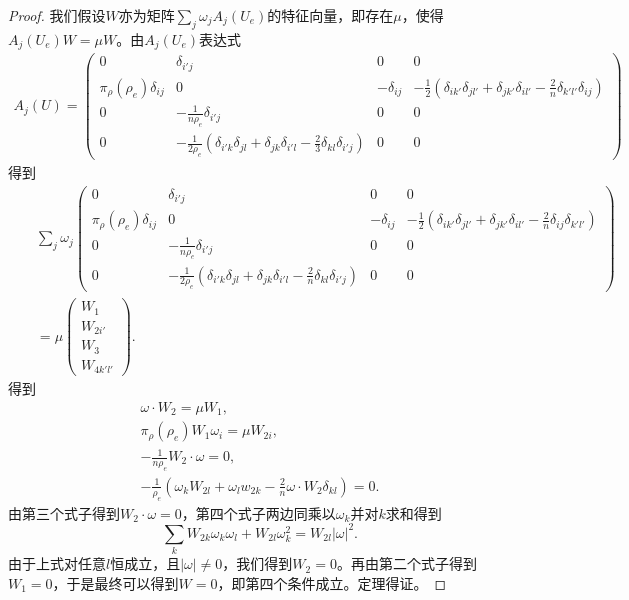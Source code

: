 \begin{proof}
	我们假设$W$亦为矩阵$\sum_j \omega_j A_j(U_e)$的特征向量，即存在$\mu$，使得$A_j(U_e) W = \mu W$。由$A_j(U_e)$表达式
	\begin{eqnarray*}
	    A_{j}(U) =
 		\left( \begin{smallmatrix} 
 		0 & \delta_{i'j} & 0 & 0  \\
 		\pi_\rho(\rho_e) \delta_{ij} & 0  &  - \delta_{ij} & -\frac{1}{2}(\delta_{ik'}\delta_{jl'} + \delta_{jk'} \delta_{il'} - \frac{2}{n} \delta_{k'l'}\delta_{ij}) \\
 		0 & - \frac{1}{n \rho_e} \delta_{i'j} & 0 & 0 \\
 		0 & -\frac{1}{2\rho_e}(\delta_{i'k}\delta_{jl} + \delta_{jk} \delta_{i'l} - \frac{2}{3} \delta_{kl} \delta_{i'j}) & 0 & 0
 		\end{smallmatrix} \right)
 	\end{eqnarray*}
	得到
	\begin{eqnarray*}
		&& \sum_j \omega_j \left( \begin{smallmatrix} 
 		0 & \delta_{i'j} & 0 & 0  \\
 		\pi_\rho(\rho_e) \delta_{ij} & 0  &  - \delta_{ij} & -\frac{1}{2}(\delta_{ik'}\delta_{jl'} + \delta_{jk'} \delta_{il'} - \frac{2}{n} \delta_{ij} \delta_{k'l'}) \\
 		0 & - \frac{1}{n \rho_e} \delta_{i'j} & 0 & 0 \\
 		0 & -\frac{1}{2\rho_e}(\delta_{i'k}\delta_{jl} + \delta_{jk} \delta_{i'l} - \frac{2}{n} \delta_{kl} \delta_{i'j}) & 0 & 0
 		\end{smallmatrix} \right) \\
 		&& = \mu \left( \begin{array}{c} W_1 \\ W_{2i'} \\W_{3} \\W_{4k'l'} \end{array} \right).
	\end{eqnarray*}
	得到
	\begin{eqnarray*}
		\omega \cdot W_2 = \mu W_1, \\ 
		\pi_{\rho}(\rho_e) W_1 \omega_{i} =\mu W_{2i}, \\
		-\frac{1}{n \rho_e} W_2 \cdot \omega  = 0, \\
		-\frac{1}{\rho_e} (\omega_{k}  W_{2l} +  \omega_{l} w_{2k} - \frac{2}{n} \omega \cdot W_2 \delta_{kl}) = 0.
	\end{eqnarray*}
	由第三个式子得到$W_2 \cdot \omega = 0$，第四个式子两边同乘以$\omega_k$并对$k$求和得到
	\begin{equation*} \label{eq:Womega}
		\sum_k W_{2k} \omega_k \omega_l + W_{2l} \omega_k^2 = W_{2l} |\omega|^2.
	\end{equation*}
	由于上式对任意$l$恒成立，且$|\omega| \neq 0$，我们得到$W_2 = 0$。再由第二个式子得到$W_1=0$，于是最终可以得到$W=0$，即第四个条件成立。定理得证。
	\end{proof}

